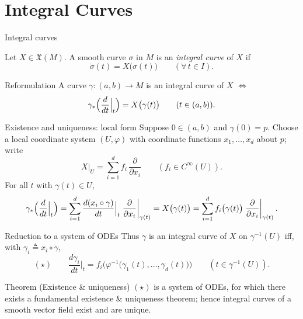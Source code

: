 \documentclass[10pt]{beamer}
\newcommand{\vX}{\mathfrak{X}}
\begin{document}
\section{Integral Curves}

\begin{frame}{Integral curves}
	\begin{definition}
		Let $X \in \vX(M)$. A smooth curve $\sigma$ in $M$ is an
		\emph{integral curve} of $X$ if
		\[
			\dot{\sigma}(t) = X\bigl(\sigma(t)\bigr)
			\qquad (\forall\, t \in I).
		\]
	\end{definition}
	\medskip
	\begin{block}{Reformulation}
		A curve $\gamma : (a, b) \to M$ is an integral curve of $X$
		$\iff$
		\[
			\gamma_*\Bigl( \frac{d}{dt} \Big|_{t} \Bigr)
			= X\bigl(\gamma(t)\bigr)
			\qquad (t \in (a, b)).
		\]
	\end{block}
\end{frame}

\begin{frame}{Existence and uniqueness: local form}
	Suppose $0 \in (a,b)$ and $\gamma(0) = p$. Choose a local coordinate
	system $(U, \varphi)$ with coordinate functions $x_1, \dots, x_d$
	about $p$; write
	\[
		X\big|_U = \sum_{i=1}^{d} f_i\, \frac{\partial}{\partial x_i}
		\qquad (f_i \in C^\infty(U)).
	\]
	For all $t$ with $\gamma(t) \in U$,
	\[
		\gamma_*\Bigl( \frac{d}{dt} \Big|_{t} \Bigr)
		= \sum_{i=1}^{d} \frac{d (x_i \circ \gamma)}{dt} \Big|_{t}
		\left. \frac{\partial}{\partial x_i} \right|_{\gamma(t)}
		= X\bigl(\gamma(t)\bigr)
		= \sum_{i=1}^{d} f_i\bigl(\gamma(t)\bigr)
		\left. \frac{\partial}{\partial x_i} \right|_{\gamma(t)} .
	\]
\end{frame}

\begin{frame}{Reduction to a system of ODEs}
	Thus $\gamma$ is an integral curve of $X$ on $\gamma^{-1}(U)$ iff,
	with $\gamma_i \triangleq x_i \circ \gamma$,
	\[
		(\star)\qquad
		\frac{d \gamma_i}{dt} \Big|_{t}
		= f_i\bigl( \varphi^{-1}\bigl( \gamma_1(t), \dots,
		\gamma_d(t) \bigr) \bigr)
		\qquad (t \in \gamma^{-1}(U)).
	\]
	\medskip
	\begin{alertblock}{Theorem (Existence \& uniqueness)}
		$(\star)$ is a system of ODEs, for which there exists a
		fundamental existence \& uniqueness theorem; hence integral
		curves of a smooth vector field exist and are unique.
	\end{alertblock}
\end{frame}
\end{document}
